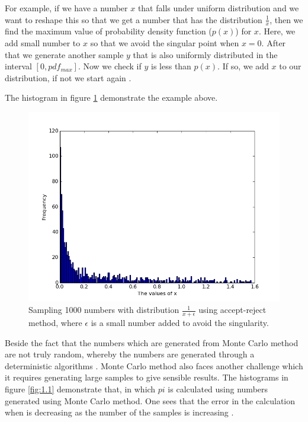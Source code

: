 For example, if we have a number $x$ that falls under uniform distribution and we want to reshape this so that we get a number  that has the distribution $\frac{1}{x}$, then we find the maximum value of probability density function ($p(x)$) for $x$. Here, we add small number to $x$ so that we avoid the singular point when $x = 0$. After that we generate another sample $y$ that is also uniformly distributed in the interval $[0,pdf_{max}]$. 
Now we check if $y $ is less than $p(x)$. If so, we add $x$ to our distribution, if not we start again \citep{Weinzierl}. 

The histogram in figure \ref{fig:2} demonstrate the example above. 

\begin{figure}[hbtp]
\centering
\includegraphics[scale=.5]{images/inverse_method.png}
\caption{Sampling 1000 numbers with distribution $\frac{1}{x+\epsilon}$ using accept-reject method, where $\epsilon$ is a small number added to avoid the singularity.}\label{fig:2}
\end{figure}

Beside the fact that the numbers which are generated from Monte Carlo method  are not truly random, whereby the numbers are generated through a deterministic algorithms  \citep{montecarlo}. Monte Carlo method also faces another challenge which it requires generating large samples to give sensible results. The histograms in figure \ref{fig:1.1} demonstrate that, in which $pi$ is calculated using numbers generated using Monte Carlo method.    
One sees that the error in the calculation when is decreasing as the number of the samples is increasing .

